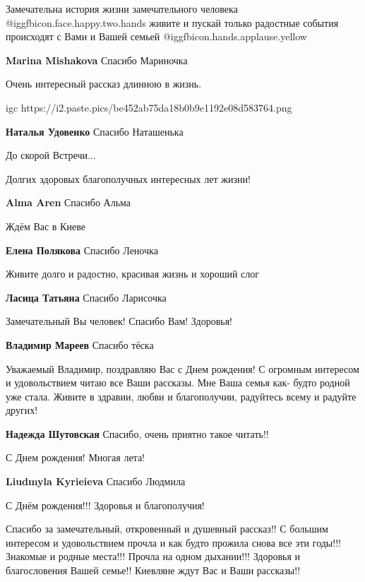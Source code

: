 
 
 
 
 


Замечательна история жизни замечательного человека
@igg{fbicon.face.happy.two.hands} живите и пускай только радостные события
происходят с Вами и Вашей семьей @igg{fbicon.hands.applause.yellow} 

\textbf{Marina Mishakova} Спасибо Мариночка

Очень интересный рассказ длинною в жизнь.

\ifcmt
  igc https://i2.paste.pics/be452ab75da18b0b9e1192e08d583764.png
\fi

\textbf{Наталья Удовенко} Спасибо Наташенька

До скорой Встречи...

Долгих здоровых благополучных интересных лет жизни!

\textbf{Alma Aren} Спасибо Альма

Ждём Вас в Киеве

\textbf{Елена Полякова} Спасибо Леночка

Живите долго и радостно, красивая жизнь и хороший слог

\textbf{Ласица Татьяна} Спасибо Ларисочка

Замечательный Вы человек! Спасибо Вам! Здоровья!

\textbf{Владимир Мареев} Спасибо тёска


Уважаемый Владимир, поздравляю Вас с Днем рождения! С огромным интересом и
удовольствием читаю все Ваши рассказы. Мне Ваша семья как- будто родной уже
стала. Живите в здравии, любви и благополучии, радуйтесь всему и радуйте
других!

\textbf{Надежда Шутовская} Спасибо, очень приятно такое читать!!

С Днем рождения!
Многая лета!

\textbf{Liudmyla Kyrieieva} Спасибо Людмила

С Днём рождения!!! Здоровья и благополучия!


Спасибо за замечательный, откровенный и душевный рассказ!! С большим интересом и
удовольствием прочла и как будто прожила снова все эти годы!!! Знакомые и
родные места!!! Прочла на одном дыхании!!! Здоровья и благословения Вашей
семье!! Киевляне ждут Вас и Ваши рассказы!!
